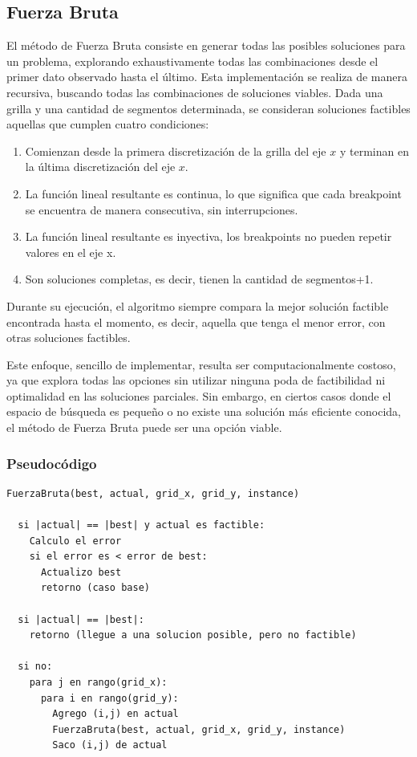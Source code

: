 \documentclass{article}
\begin{document}
    \subsection{Fuerza Bruta}
        El método de Fuerza Bruta consiste en generar todas las posibles soluciones para un problema, explorando exhaustivamente todas las combinaciones desde el primer dato observado hasta el último. Esta implementación se realiza de manera recursiva, buscando todas las combinaciones de soluciones viables. Dada una grilla y una cantidad de segmentos determinada, se consideran soluciones factibles aquellas que cumplen cuatro condiciones:
        \begin{enumerate}
            \item Comienzan desde la primera discretización de la grilla del eje $x$ y terminan en la última discretización del eje $x$.
            \item La función lineal resultante es continua, lo que significa que cada breakpoint se encuentra de manera consecutiva, sin interrupciones.
            \item La función lineal resultante es inyectiva, los breakpoints no pueden repetir valores en el eje x.
            \item Son soluciones completas, es decir, tienen la cantidad de segmentos+1. 
        \end{enumerate}
        
        Durante su ejecución, el algoritmo siempre compara la mejor solución factible encontrada hasta el momento, es decir, aquella que tenga el menor error, con otras soluciones factibles.  

        Este enfoque, sencillo de implementar, resulta ser computacionalmente costoso, ya que explora todas las opciones sin utilizar ninguna poda de factibilidad ni optimalidad en las soluciones parciales. Sin embargo, en ciertos casos donde el espacio de búsqueda es pequeño o no existe una solución más eficiente conocida, el método de Fuerza Bruta puede ser una opción viable.

        \subsubsection{Pseudocódigo}
        
        \begin{lstlisting}[language=pseudocode]
FuerzaBruta(best, actual, grid_x, grid_y, instance)

  si |actual| == |best| y actual es factible:
    Calculo el error
    si el error es < error de best:
      Actualizo best
      retorno (caso base)

  si |actual| == |best|:
    retorno (llegue a una solucion posible, pero no factible)

  si no:
    para j en rango(grid_x):
      para i en rango(grid_y):
        Agrego (i,j) en actual
        FuerzaBruta(best, actual, grid_x, grid_y, instance)
        Saco (i,j) de actual
\end{lstlisting}
\end{document}
